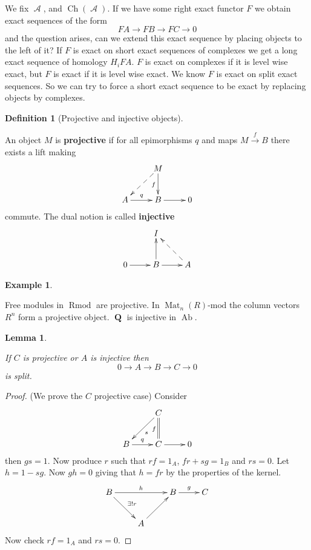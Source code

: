 \documentclass[10pt,]{book}
\newcommand{\terminology}[1]{\textbf{#1}}
\theoremstyle{plain}
\newtheorem{lemma}[theorem]{Lemma}
\theoremstyle{definition}
\newtheorem{definition}[theorem]{Definition}
\newtheorem{example}[theorem]{Example}
\numberwithin{equation}{section}
\DeclareMathOperator{\Ch}{Ch}
\DeclareMathOperator{\Ab}{\text{Ab}}
\DeclareMathOperator{\QQ}{\mathbf{Q}}
\DeclareMathOperator{\Rmod}{R\text{mod}}
\DeclareMathOperator{\cA}{\mathcal{A}}
\DeclareMathOperator{\Mat}{Mat}
\begin{document}
          We fix \(\cA\), and \(\Ch(\cA)\).
          If we have some right exact functor \(F\) we obtain exact sequences of the form
          \[FA \to FB \to FC \to 0\]
          and the question arises, can we extend this exact sequence by placing objects to the left of it?\newline{}
          If \(F\) is exact on short exact sequences of complexes we get a long exact sequence of homology \(H_iFA\).
          \(F\) is exact on complexes if it is level wise exact, but \(F\) is exact if it is level wise exact.
          We know \(F\) is exact on split exact sequences.
          So we can try to force a short exact sequence to be exact by replacing objects by complexes.
\begin{definition}[Projective and injective objects]\label{definition-17}

            An object \(M\) is \terminology{projective} if for all epimorphisms \(q\) and maps \(M \xrightarrow{f} B\) there exists a lift making
            \[
              \xymatrix{ & M \ar[d]_f \ar@{-->}[dl]&\\
              A \ar[r]^q &B \ar[r] & 0}
            \]
            commute.
            The dual notion is called \terminology{injective}\[
              \xymatrix{ & I&\\
              0 \ar[r] &B \ar[u] \ar[r] & A  \ar@{-->}[ul]}
            \]\end{definition}
\begin{example}\label{example-9}

            Free modules in \(\Rmod\) are projective.
            In \(\Mat_n(R)\text{-mod}\) the column vectors \(R^n\) form a projective object.
            \(\QQ\) is injective in \(\Ab\).
          \end{example}
\begin{lemma}\label{lemma-proj-inj-split}

            If \(C\) is projective or \(A\) is injective then
            \[
              0 \to A \to B \to C \to 0
            \]
            is split.
          \end{lemma}
\begin{proof}

            (We prove the \(C\) projective case) Consider 
            \[
              \xymatrix{ & C \ar@{=}[d]_f \ar[dl]^s&\\
              B \ar[r]^q &C \ar[r] & 0}
            \]
            then \(gs = 1\).
            Now produce \(r\) such that \(rf = 1_A\), \(fr + sg = 1_B\) and \(rs = 0\).
            Let \(h  = 1 -sg\).
            Now \(gh = 0\) giving that \(h = fr\) by the properties of the kernel.
            \[
              \xymatrix{B \ar[rr]^h\ar[rd]^{\exists ! r} &&B \ar[r]^g &C \\ & A \ar[ur] &}
            \]
            Now check \(rf = 1_A\) and \(rs = 0\).
          \end{proof}
\par
\end{document}
